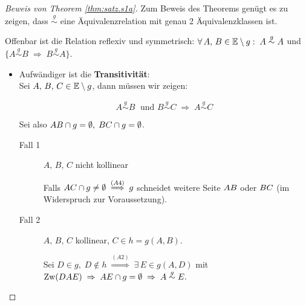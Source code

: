 \begin{proof}[Beweis von Theorem \ref{thm:satz.s1a}]
    Zum Beweis des Theorems genügt es zu zeigen, dass $\stackrel{g}{\sim}$ eine Äquivalenzrelation
    mit genau 2 Äquivalenzklassen ist.

    Offenbar ist die Relation reflexiv und symmetrisch: $\forall\, A,\, B \in \mathbb E \setminus g : \; A
    \stackrel{g}{\sim} A$ und $\{A \stackrel{g}{\sim} B\; \Rightarrow\; B \stackrel{g}{\sim} A\}$.

    \begin{itemize}
        \item Aufwändiger ist die {\bf Transitivität}:\\
        Sei $A,\, B,\, C \in \mathbb E \setminus g$, dann müssen wir zeigen:

        $$
            A \stackrel{g}{\sim} B\; \mbox{ und } B \stackrel{g}{\sim} C\; \Rightarrow\; A
            \stackrel{g}{\sim} C
        $$

        Sei also ${AB} \cap g = \emptyset,\; {BC} \cap g = \emptyset$.

        \begin{description}
            \item[Fall 1] $A,\, B,\, C$ nicht kollinear

                Falls ${AC} \cap g \neq \emptyset\; \stackrel{(A4)}{\Longrightarrow}\; g$
                schneidet weitere Seite ${AB}$ oder ${BC}$ (im Widerspruch zur
                Voraussetzung).

            \item[Fall 2] $A,\, B,\, C$ kollinear, $C \in h = g(A,B)$.

                Sei $D \in g,\; D \notin h\; \stackrel{(A2)}{\Longrightarrow}\; \exists\, E \in
                g(A,D)$ mit $\operatorname{Zw}(DAE)\; \Rightarrow\; {AE} \cap g = \emptyset\; \Rightarrow\; A
                \stackrel{g}{\sim} E.$




\end{description}
\end{itemize}
\end{proof}
